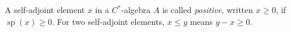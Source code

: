 A self-adjoint element $x$ in a $C^*$-algebra $A$ is called \emph{positive}, written $x \geqslant 0$, if $\operatorname{sp}(x) \geqslant 0$. For two self-adjoint elements, $x \leqslant y$ means $y - x \geqslant 0$.
